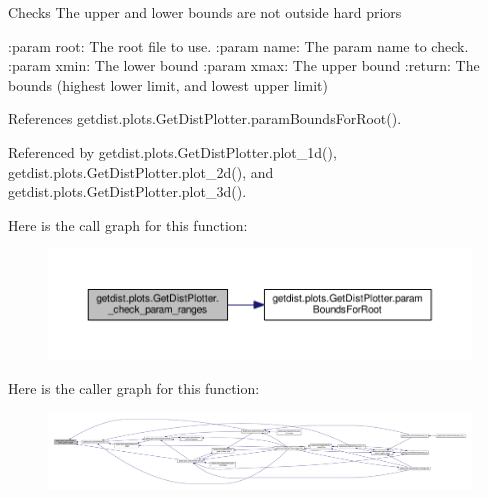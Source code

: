\begin{DoxyVerb}Checks The upper and lower bounds are not outside hard priors

:param root: The root file to use.
:param name: The param name to check.
:param xmin: The lower bound
:param xmax: The upper bound
:return: The bounds (highest lower limit, and lowest upper limit)
\end{DoxyVerb}
 

References getdist.\+plots.\+Get\+Dist\+Plotter.\+param\+Bounds\+For\+Root().



Referenced by getdist.\+plots.\+Get\+Dist\+Plotter.\+plot\+\_\+1d(), getdist.\+plots.\+Get\+Dist\+Plotter.\+plot\+\_\+2d(), and getdist.\+plots.\+Get\+Dist\+Plotter.\+plot\+\_\+3d().

Here is the call graph for this function\+:
\nopagebreak
\begin{figure}[H]
\begin{center}
\leavevmode
\includegraphics[width=350pt]{classgetdist_1_1plots_1_1GetDistPlotter_a578f829c6d10c20eb150703b876f0411_cgraph}
\end{center}
\end{figure}
Here is the caller graph for this function\+:
\nopagebreak
\begin{figure}[H]
\begin{center}
\leavevmode
\includegraphics[width=350pt]{classgetdist_1_1plots_1_1GetDistPlotter_a578f829c6d10c20eb150703b876f0411_icgraph}
\end{center}
\end{figure}
\mbox{\label{classgetdist_1_1plots_1_1GetDistPlotter_a2dd109cafefa1d1d8f3078208c79c4a6}} 
